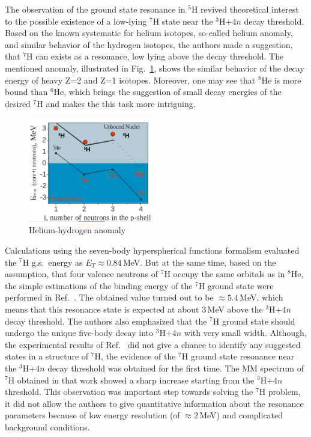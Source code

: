 The observation of the ground state resonance in $^{5}$H \cite{Korsheninnikov:2001} revived theoretical interest to the possible existence of a low-lying $^{7}$H  state near the $^{3}$H+$4n$ decay threshold.
Based on the known systematic for helium isotopes, so-called helium anomaly, and similar behavior of the hydrogen isotopes, the authors made a suggestion, that $^{7}$H can exists as a resonance, low lying above the decay threshold.   
The mentioned anomaly, illustrated in Fig.\ \ref{fig:helium_anomaly}, shows the similar behavior of the decay energy of heavy Z=2 and Z=1 isotopes. 
Moreover, one may see that $^{8}$He is more bound than $^{6}$He, which brings the suggestion of small decay energies of the desired $^{7}$H and makes the this task more intriguing.
\begin{figure}[t]
	\begin{center}
		\includegraphics[width=0.49\textwidth]{figures/anomalie.png}
	\end{center}
	\caption{Helium-hydrogen anomaly}
	\label{fig:helium_anomaly}
\end{figure}

Calculations using the seven-body hyperspherical functions formalism \cite{Timofeyuk:2002} evaluated the $^{7}$H g.s.\ energy as $E_{T} \approx 0.84$\,MeV.
But at the same time, based on the assumption, that four valence neutrons of $^{7}$H occupy the same orbitals as in $^{8}$He, the simple estimations of the binding energy of the $^{7}$H ground state were performed in Ref.\ \cite{Korsheninnikov:2003}. 
The obtained value turned out to be $\approx 5.4$\,MeV, which means that this resonance state is expected at about 3\,MeV above the $^3$H+$4n$ decay threshold.
The authors also emphasized that the $^{7}$H ground state should undergo the unique five-body decay into $^3$H+$4n$ with very small width. 
Although, the experimental results of Ref.\ \cite{Korsheninnikov:2003} did not give a chance to identify any suggested states in a structure of $^{7}$H, the evidence of the $^{7}$H ground state resonance near the $^3$H+$4n$ decay threshold was obtained for the first time.
The MM spectrum of $^{7}$H obtained in that work showed a sharp increase starting from the $^3$H+$4n$ threshold.
This observation was important step towards solving the $^{7}$H problem, it did not allow the authors to give quantitative information about the resonance parameters because of low energy resolution (of $\approx 2$\,MeV) and complicated background conditions.

